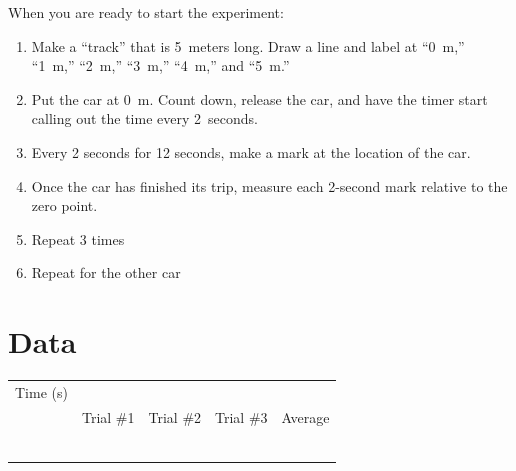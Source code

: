 \documentclass[10pt]{exam}
\begin{document}
\noindent
When you are ready to start the experiment:

\begin{enumerate}
  \item Make a ``track'' that is 5~meters long.  Draw a line and label at ``0~m,'' ``1~m,'' ``2~m,'' ``3~m,'' ``4~m,'' and ``5~m.''
  \item Put the car at 0~m.
  Count down, release the car, and have the timer start calling out the time every 2~seconds.
  \item Every 2 seconds for 12 seconds, make a mark at the location of the car.
  \item Once the car has finished its trip, measure each 2-second mark relative to the zero point.
  \item Repeat 3 times
  \item Repeat for the other car
\end{enumerate}

\section*{Data}

\renewcommand{\arraystretch}{1.6}

\def\cw{.15\textwidth}
\newcommand{\datatable}[2]{
  \def\expno{#1}
  \def\exptitle{#2}
  \begin{center}
    \begin{tabular}
      {
        |*{4}{>{\centering\arraybackslash}m{\cw}|}
        |>{\centering\arraybackslash}m{\cw}|
      }
      \hline
      \multicolumn{5}{|l|}{\textbf{Experiment \expno:} \exptitle} \\
      \hline
      \multirow{2}{\cw}
        {\centering Time (s)} & 
      \multicolumn{4}{c|}{Displacement (m)} \\
      \cline{2-5}
      & Trial \#1 & Trial \#2 & Trial \#3 & Average \\
      \hline  
      2 &&&&\\
      \hline
      4 &&&&\\
      \hline
      6 &&&&\\
      \hline
      8 &&&&\\
      \hline
      10 &&&&\\
      \hline
      12 &&&&\\
      \hline
    \end{tabular}
  \end{center}
}
  
  \datatable{\#1}{Red Car}
\end{document}
